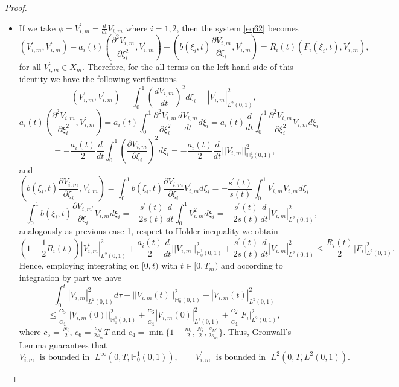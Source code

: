 \documentclass[preprint,12pt,authoryear]{elsarticle}
\begin{document}
\begin{proof}
\begin{itemize}
        \item[Case 2.] If we take $\phi=V_{i,m}^{\prime}=\frac{d}{dt}V_{i,m}$ where $i=1,2$, then the system \eqref{eq62} becomes
        $$\left(V_{i,m}^{\prime},V_{i,m}^{\prime}\right)-a_i(t)\left(\frac{\partial^2 V_{i,m}}{\partial \xi_i^2},V_{i,m}^{\prime}\right)-\left(b(\xi_i,t)\frac{\partial V_{i,m}}{\partial \xi_i},V_{i,m}^{\prime}\right)=R_i(t)\left(F_i(\xi_i,t),V_{i,m}^{\prime}\right),$$
        for all $V_{i,m}^{\prime}\in X_m$.
        Therefore, for the all terms on the left-hand side of this identity we have the following verifications
        $$\left(V_{i,m}^{\prime},V_{i,m}^{\prime}\right)=\int_0^1\left(\frac{dV_{i,m}}{dt}\right)^2 d\xi_i=|V_{i,m}^{\prime}|_{L^2(0,1)}^2,$$
        $$a_i(t)\left(\frac{\partial^2 V_{i,m}}{\partial \xi_i^2},V_{i,m}^{\prime}\right)=a_i(t)\int_0^1\frac{\partial^2V_{i,m}}{\partial\xi_i^2}\frac{dV_{i,m}}{dt}d\xi_i=a_i(t)\frac{d}{dt}\int_0^1\frac{\partial^2V_{i,m}}{\partial\xi_i^2} V_{i,m}d\xi_i$$
        $$=-\frac{a_i(t)}{2}\frac{d}{dt}\int_0^1\left(\frac{\partial V_{i,m}}{\partial\xi_i}\right)^2d\xi_i=-\frac{a_i(t)}{2}\frac{d}{dt}||V_{i,m}||_{\mathbb{H}_0^1(0,1)}^2,$$
        and 
        $$\left(b(\xi_i,t)\frac{\partial V_{i,m}}{\partial \xi_i},V_{i,m}^{\prime}\right)=\int_0^1 b(\xi_i,t)\frac{\partial V_{i,m}}{\partial \xi_i}V_{i,m}^{\prime}d\xi_i=-\frac{s^{\prime}(t)}{s(t)}\int_0^1 V_{i,m}^{\prime} V_{i,m}d\xi_i$$
        $$-\int_0^1 b(\xi_i,t)\frac{\partial V_{i,m^{\prime}}}{\partial \xi_i}V_{i,m}d\xi_i=-\frac{s^{\prime}(t)}{2s(t)}\frac{d}{dt}\int_0^1 V_{i,m}^2d\xi_i=-\frac{s^{\prime}(t)}{2s(t)}\frac{d}{dt}|V_{i,m}|_{L^2(0,1)}^2,$$
        analogously as previous case 1, respect to Holder inequality we obtain
        $$\left(1-\frac{1}{2}R_i(t)\right)|V_{i,m}^{\prime}|_{L^2(0,1)}^2+\frac{a_i(t)}{2}\frac{d}{dt}||V_{i,m}||_{\mathbb{H}_0^1(0,1)}^2+\frac{s^{\prime}(t)}{2s(t)}\frac{d}{dt}|V_{i,m}|_{L^2(0,1)}^2\leq\frac{R_i(t)}{2}|F_i|_{L^2(0,1)}^2.$$
        Hence, employing integrating on $[0,t)$ with $t\in[0,T_m)$ and according to integration by part we have
        $$\int_0^t |V_{i,m}|_{L^2(0,1)}^2d\tau+||V_{i,m}(t)||_{\mathbb{H}_0^1(0,1)}^2+|V_{i,m}(t)|_{L^2(0,1)}^2$$
        $$\leq\frac{c_5}{c_4}||V_{i,m}(0)||_{\mathbb{H}_0^1(0,1)}^2+\frac{c_6}{c_4}|V_{i,m}(0)|_{L^2(0,1)}^2+\frac{c_2}{c_4}|F_i|_{L^2(0,1)}^2,$$
        where $c_5=\frac{N_i}{2}$, $c_6=\frac{s_{M^{\prime}}}{2s_m}T$ and $c_4=\min\{1-\frac{m_i}{2},\frac{N_i}{2}, \frac{s_{M^{\prime}}}{2s_m}\}$. Thus, Gronwall's Lemma guarantees that
        $$V_{i,m}\;\text{ is bounded in }\; L^{\infty}(0,T,\mathbb{H}_0^1(0,1)),\quad\quad V_{i,m}^{\prime}\;\text{ is bounded in }\; L^2(0,T,L^2(0,1)).$$

\end{itemize}
\end{proof}
\end{document}
